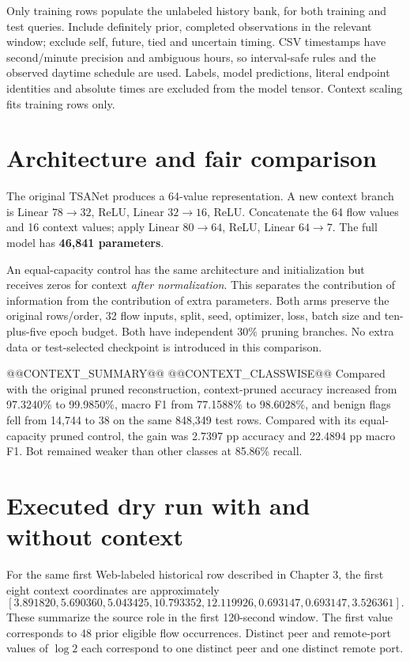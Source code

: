 \documentclass[11pt,a4paper,oneside]{report}
\begin{document}
Only training rows populate the unlabeled history bank, for both training and test queries. Include definitely prior, completed observations in the relevant window; exclude self, future, tied and uncertain timing. CSV timestamps have second/minute precision and ambiguous hours, so interval-safe rules and the observed daytime schedule are used. Labels, model predictions, literal endpoint identities and absolute times are excluded from the model tensor. Context scaling fits training rows only.

\section{Architecture and fair comparison}
The original TSANet produces a 64-value representation. A new context branch is Linear $78\to32$, ReLU, Linear $32\to16$, ReLU. Concatenate the 64 flow values and 16 context values; apply Linear $80\to64$, ReLU, Linear $64\to7$. The full model has \textbf{46,841 parameters}.

An equal-capacity control has the same architecture and initialization but receives zeros for context \emph{after normalization}. This separates the contribution of information from the contribution of extra parameters. Both arms preserve the original rows/order, 32 flow inputs, split, seed, optimizer, loss, batch size and ten-plus-five epoch budget. Both have independent 30\% pruning branches. No extra data or test-selected checkpoint is introduced in this comparison.

@@CONTEXT_SUMMARY@@
@@CONTEXT_CLASSWISE@@
Compared with the original pruned reconstruction, context-pruned accuracy increased from 97.3240\% to 99.9850\%, macro F1 from 77.1588\% to 98.6028\%, and benign flags fell from 14,744 to 38 on the same 848,349 test rows. Compared with its equal-capacity pruned control, the gain was 2.7397 pp accuracy and 22.4894 pp macro F1. Bot remained weaker than other classes at 85.86\% recall.

\section{Executed dry run with and without context}
For the same first Web-labeled historical row described in Chapter 3, the first eight context coordinates are approximately
\[[3.891820,5.690360,5.043425,10.793352,12.119926,0.693147,0.693147,3.526361].\]
These summarize the source role in the first 120-second window. The first value corresponds to 48 prior eligible flow occurrences. Distinct peer and remote-port values of $\log 2$ each correspond to one distinct peer and one distinct remote port.
\end{document}
